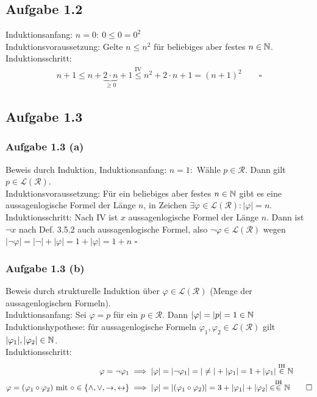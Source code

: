 \subsection{Aufgabe 1.2}
Induktionsanfang: $n=0:~0\leq0=0^2$\\
Induktionsvoraussetzung: Gelte $n\leq n^2$ für beliebiges aber festes $n\in\mathbb{N}$.\\
Induktionsschritt: 
\begin{align*}
	n+1\leq
	n+\underbrace{2\cdot n}_{\geq0}+1
	\overset{\text{IV}}{\leq} n^2+2\cdot n+1=(n+1)^2\qquad\square
\end{align*}

\subsection{Aufgabe 1.3}
\subsubsection{Aufgabe 1.3 (a)}
Beweis durch Induktion, Induktionsanfang: $n=1:$ Wähle $p\in\mathcal{R}$. 
Dann gilt $p\in\mathcal{L}(\mathcal{R})$.\\
Induktionsvoraussetzung: Für ein beliebiges aber festes $n\in\mathbb{N}$ gibt es eine aussagenlogische Formel der Länge $n$, in Zeichen $\exists\varphi\in\mathcal{L}(\mathcal{R}):|\varphi|=n$.\\
Induktionsschritt: Nach IV ist $x$ aussagenlogische Formel der Länge $n$. 
Dann ist $\neg x$ nach Def. 3.5.2 auch aussagenlogische Formel, also $\neg\varphi\in\mathcal{L}(\mathcal{R})$ wegen
$|\neg\varphi|=|\neg|+|\varphi|=1+|\varphi|=1+n$ $\square$

\subsubsection{Aufgabe 1.3 (b)}
Beweis durch strukturelle Induktion über $\varphi\in\mathcal{L}(\mathcal{R})$ (Menge der aussagenlogischen Formeln).\\
Induktionsanfang: Sei $\varphi=p$ für ein $p\in\mathcal{R}$. Dann $|\varphi|=|p|=1\in\mathbb{N}$\\
Induktionshypothese: für aussagenlogische Formeln $\varphi_1,\varphi_2\in\mathcal{L}(\mathcal{R})$ gilt $|\varphi_1|,|\varphi_2|\in\mathbb{N}$.\\
Induktionsschritt: 
\begin{align*}
	\varphi=\neg\varphi_1&\implies|\varphi|=|\neg\varphi_1|=|\neq|+|\varphi_1|=1+|\varphi_1|\stackrel{\text{IH}}{\in}\mathbb{N}\\
	\varphi=(\varphi_1\circ\varphi_2)\text{ mit }\circ\in\lbrace\wedge,\vee,\to,\leftrightarrow\rbrace&\implies|\varphi|=|(\varphi_1\circ\varphi_2)|=3+|\varphi_1|+|\varphi_2|\in\stackrel{\text{IH}}{\in}\mathbb{N}\qquad\square
\end{align*}


